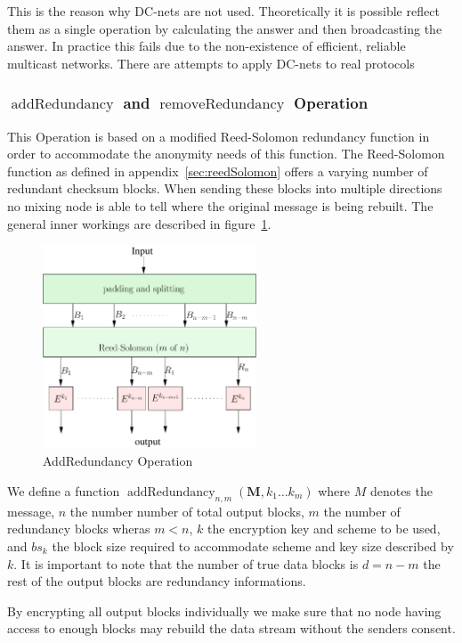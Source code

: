 \documentclass[9pt,journal,compsoc]{IEEEtran}
\DeclareMathOperator{\addRedundancy}{addRedundancy}
\DeclareMathOperator{\removeRedundancy}{removeRedundancy}
\begin{document}
This is the reason why DC-nets are not used. Theoretically it is possible reflect them as a single operation by calculating the answer and then broadcasting the answer. In practice this fails due to the non-existence of efficient, reliable multicast networks. There are attempts to apply DC-nets to real protocols \cite{Corrigan-Gibbs:2010:DAA:1866307.1866346}

\subsubsection{$\addRedundancy$ and $\removeRedundancy$ Operation}
This Operation is based on a modified Reed-Solomon redundancy function in order to accommodate the anonymity needs of this function. The Reed-Solomon function as defined in appendix~\ref{sec:reedSolomon} offers a varying number of redundant checksum blocks. When sending these blocks into multiple directions no mixing node is able to tell where the original message is being rebuilt. The general inner workings are described in figure~\ref{fig:addRedundancy}.

\begin{figure}[!t]
	\centering
	\includegraphics[width=2.5in]{../inc/addRedundancyOp}
	\caption{AddRedundancy Operation}
	\label{fig:addRedundancy}
\end{figure}

We define a function $\addRedundancy_{n,m}( \mathbf{M},k_1\ldots k_{m} )$ where $M$ denotes the message, $n$ the number number of total output blocks, $m$ the number of redundancy blocks wheras $m<n$, $k$ the encryption key and scheme to be used, and $bs_k$ the block size required to accommodate scheme and key size described by $k$. It is important to note that the number of true data blocks is $d=n-m$ the rest of the output blocks are redundancy informations.

By encrypting all output blocks individually we make sure that no node having access to enough blocks may rebuild the data stream without the senders consent.
\end{document}
